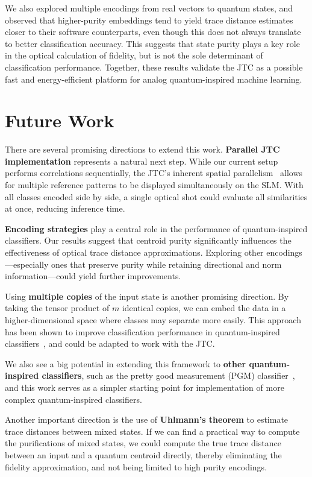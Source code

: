 \documentclass[twocolumn]{article} %
\begin{document}
We also explored multiple encodings from real vectors to quantum states, and observed that higher-purity embeddings tend to yield trace distance estimates closer to their software counterparts, even though this does not always translate to better classification accuracy. This suggests that state purity plays a key role in the optical calculation of fidelity, but is not the sole determinant of classification performance.  
Together, these results validate the JTC as a possible fast and energy-efficient platform for analog quantum-inspired machine learning.
\section{Future Work}
\label{sec:future-work}

There are several promising directions to extend this work. \textbf{Parallel JTC implementation} represents a natural next step. While our current setup performs correlations sequentially, the JTC's inherent spatial parallelism~\cite{lightpipes2021} allows for multiple reference patterns to be displayed simultaneously on the SLM. With all classes encoded side by side, a single optical shot could evaluate all similarities at once, reducing inference time.

\textbf{Encoding strategies} play a central role in the performance of quantum-inspired classifiers. Our results suggest that centroid purity significantly influences the effectiveness of optical trace distance approximations. Exploring other encodings—especially ones that preserve purity while retaining directional and norm information—could yield further improvements.

Using \textbf{multiple copies} of the input state is another promising direction. By taking the tensor product of \(m\) identical copies, we can embed the data in a higher-dimensional space where classes may separate more easily. This approach has been shown to improve classification performance in quantum-inspired classifiers~\cite{Cruzeiro2024}, and could be adapted to work with the JTC.

We also see a big potential in extending this framework to \textbf{other quantum-inspired classifiers}, such as the pretty good measurement (PGM) classifier~\cite{Cruzeiro2024}, and this work serves as a simpler starting point for implementation of more complex quantum-inspired classifiers.

Another important direction is the use of \textbf{Uhlmann's theorem} to estimate trace distances between mixed states. If we can find a practical way to compute the purifications of mixed states, we could compute the true trace distance between an input and a quantum centroid directly, thereby eliminating the fidelity approximation, and not being limited to high purity encodings.
\end{document}
